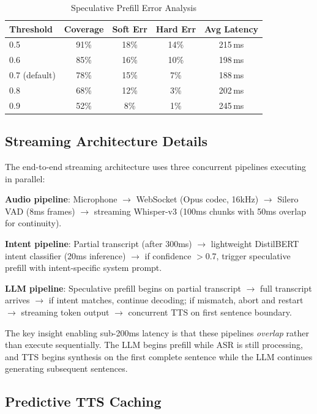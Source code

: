 \documentclass[conference,10pt]{IEEEtran}
\begin{document}
\begin{table}[!htbp]
\caption{Speculative Prefill Error Analysis}
\label{tab:specerr}
\centering\scriptsize
\begin{tabular}{@{}lcccc@{}}
\toprule
\textbf{Threshold} & \textbf{Coverage} & \textbf{Soft Err} & \textbf{Hard Err} & \textbf{Avg Latency} \\
\midrule
0.5 & 91\% & 18\% & 14\% & 215\,ms \\
0.6 & 85\% & 16\% & 10\% & 198\,ms \\
0.7 (default) & 78\% & 15\% & 7\% & 188\,ms \\
0.8 & 68\% & 12\% & 3\% & 202\,ms \\
0.9 & 52\% & 8\% & 1\% & 245\,ms \\
\bottomrule
\end{tabular}
\end{table}

\subsection{Streaming Architecture Details}

The end-to-end streaming architecture uses three concurrent pipelines executing in parallel:

\textbf{Audio pipeline}: Microphone $\to$ WebSocket (Opus codec, 16kHz) $\to$ Silero VAD (8ms frames) $\to$ streaming Whisper-v3 (100ms chunks with 50ms overlap for continuity).

\textbf{Intent pipeline}: Partial transcript (after 300ms) $\to$ lightweight DistilBERT intent classifier (20ms inference) $\to$ if confidence $>$0.7, trigger speculative prefill with intent-specific system prompt.

\textbf{LLM pipeline}: Speculative prefill begins on partial transcript $\to$ full transcript arrives $\to$ if intent matches, continue decoding; if mismatch, abort and restart $\to$ streaming token output $\to$ concurrent TTS on first sentence boundary.

The key insight enabling sub-200ms latency is that these pipelines \emph{overlap} rather than execute sequentially. The LLM begins prefill while ASR is still processing, and TTS begins synthesis on the first complete sentence while the LLM continues generating subsequent sentences.

\subsection{Predictive TTS Caching}
\end{document}
